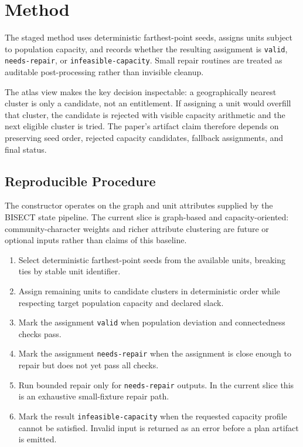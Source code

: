 \section{Method}

The staged method uses deterministic farthest-point seeds, assigns units subject
to population capacity, and records whether the resulting assignment is
\texttt{valid}, \texttt{needs-repair}, or \texttt{infeasible-capacity}. Small
repair routines are treated as auditable post-processing rather than invisible
cleanup.

The atlas view makes the key decision inspectable: a geographically nearest
cluster is only a candidate, not an entitlement. If assigning a unit would
overfill that cluster, the candidate is rejected with visible capacity
arithmetic and the next eligible cluster is tried. The paper's artifact claim
therefore depends on preserving seed order, rejected capacity candidates,
fallback assignments, and final status.

\subsection{Reproducible Procedure}

The constructor operates on the graph and unit attributes supplied by the
BISECT state pipeline. The current slice is graph-based and capacity-oriented:
community-character weights and richer attribute clustering are future or
optional inputs rather than claims of this baseline.

\begin{enumerate}
  \item Select deterministic farthest-point seeds from the available units,
        breaking ties by stable unit identifier.
  \item Assign remaining units to candidate clusters in deterministic order
        while respecting target population capacity and declared slack.
  \item Mark the assignment \texttt{valid} when population deviation and
        connectedness checks pass.
  \item Mark the assignment \texttt{needs-repair} when the assignment is close
        enough to repair but does not yet pass all checks.
  \item Run bounded repair only for \texttt{needs-repair} outputs. In the
        current slice this is an exhaustive small-fixture repair path.
  \item Mark the result \texttt{infeasible-capacity} when the requested capacity
        profile cannot be satisfied. Invalid input is returned as an error
        before a plan artifact is emitted.
\end{enumerate}


